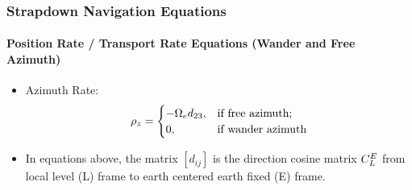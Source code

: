 \begin{frame}
\frametitle{Strapdown Navigation Equations}
\framesubtitle{Position Rate / Transport Rate Equations (Wander and Free Azimuth)}
\begin{itemize}
  \item Azimuth Rate:
\[
\rho_z= 
\begin{cases} 
-\Omega_e d_{23}, &\text{if free azimuth;}\\ 
0,  &\text{if wander azimuth} 
\end{cases}
\]
  \item In equations above, the matrix $\left[d_{ij}\right]$ is the direction cosine matrix $C_{L}^{E}$ from local level (L) frame to earth centered earth fixed (E) frame.
\end{itemize} 
\end{frame}
